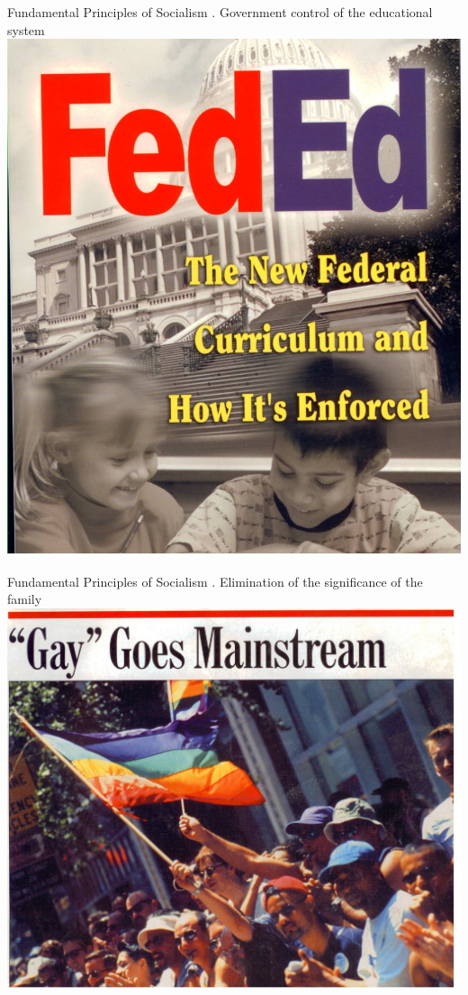 \begin{frame}[t]{Fundamental Principles of Socialism}
    . Government control of the educational system \\
    \includegraphics[height=.9\textheight]{img/education.jpg} \\
\end{frame}

\begin{frame}[t]{Fundamental Principles of Socialism}
    . Elimination of the significance of the family \\
    \includegraphics[height=.9\textheight]{img/gay.jpg} \\
\end{frame}

